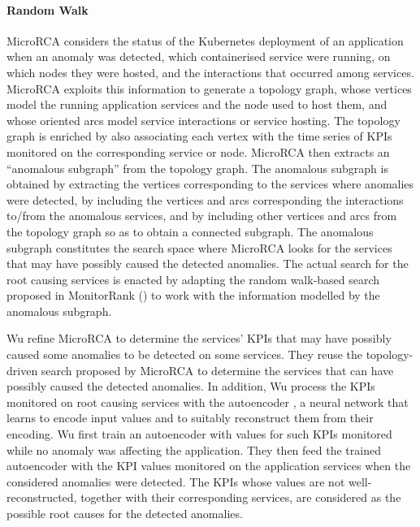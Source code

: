 \paragraph{Random Walk}
MicroRCA \cite{04_Wu2020_MicroRCA} considers the status of the Kubernetes deployment of an application when an anomaly was detected, \viz which containerised service were running, on which nodes they were hosted, and the interactions that occurred among services. 
MicroRCA \cite{04_Wu2020_MicroRCA} exploits this information to generate a topology graph, whose vertices model the running application services and the node used to host them, and whose oriented arcs model service interactions or service hosting. 
The topology graph is enriched by also associating each vertex with the time series of KPIs monitored on the corresponding service or node.
MicroRCA \cite{04_Wu2020_MicroRCA} then extracts an \enquote{anomalous subgraph} from the topology graph.
The anomalous subgraph is obtained by extracting the vertices corresponding to the services where anomalies were detected, by including the vertices and arcs corresponding the interactions to/from the anomalous services, and by including other vertices and arcs from the topology graph so as to obtain a connected subgraph.
The anomalous subgraph constitutes the search space where MicroRCA \cite{04_Wu2020_MicroRCA} looks for the services that may have possibly caused the detected anomalies.
The actual search for the root causing services is enacted by adapting the random walk-based search proposed in MonitorRank \cite{21_Kim2013_RootCauseDetectionSOA} () to work with the information modelled by the anomalous subgraph.

Wu \etal \cite{09_Wu2020_MicroserviceDiagnosisDeepLearning} refine MicroRCA \cite{09_Wu2020_MicroserviceDiagnosisDeepLearning} to determine the services' KPIs that may have possibly caused some anomalies to be detected on some services.
They reuse the topology-driven search proposed by MicroRCA \cite{04_Wu2020_MicroRCA} to determine the services that can have possibly caused the detected anomalies.
In addition, Wu \etal \cite{09_Wu2020_MicroserviceDiagnosisDeepLearning} process the KPIs monitored on root causing services with the autoencoder \cite{Goodfellow2016_DeepLearningBook}, \viz a neural network that learns to encode input values and to suitably reconstruct them from their encoding.
Wu \etal \cite{09_Wu2020_MicroserviceDiagnosisDeepLearning} first train an autoencoder with values for such KPIs monitored while no anomaly was affecting the application.
They then feed the trained autoencoder with the KPI values monitored on the application services when the considered anomalies were detected.
The KPIs whose values are not well-reconstructed, together with their corresponding services, are considered as the possible root causes for the detected anomalies.

